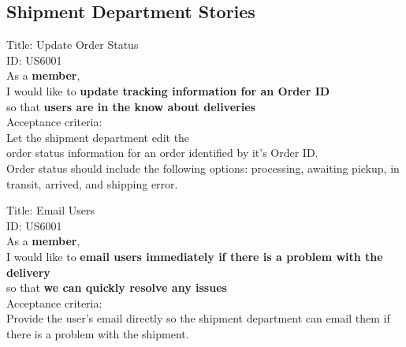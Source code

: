 \documentclass{article}
\begin{document}
\subsection{Shipment Department Stories}
\begin{framed}
\noindent
Title:  Update Order Status \\
ID: US6001 \\
As a \textbf{member},\\
\textbullet  \quad \quad I would like to \textbf{update tracking information for an Order ID}\\ 
\textbullet  \quad \quad so that \textbf{users are in the know about deliveries}\\
Acceptance criteria: \\
\textbullet  \quad \quad Let the shipment department edit the\\ order status information for an order identified by it's Order ID.\\
\textbullet  \quad \quad Order status should include the following options: processing, awaiting pickup, in transit, arrived, and shipping error.
\end{framed}


\begin{framed}
\noindent
Title:  Email Users \\
ID: US6001 \\
As a \textbf{member},\\
\textbullet  \quad \quad I would like to \textbf{email users immediately if there is a problem with the delivery}\\ 
\textbullet  \quad \quad so that \textbf{we can quickly resolve any issues}\\
Acceptance criteria: \\
\textbullet  \quad \quad Provide the user's email directly so the shipment department can email them if there is a problem with the shipment.
\end{framed}
\end{document}
